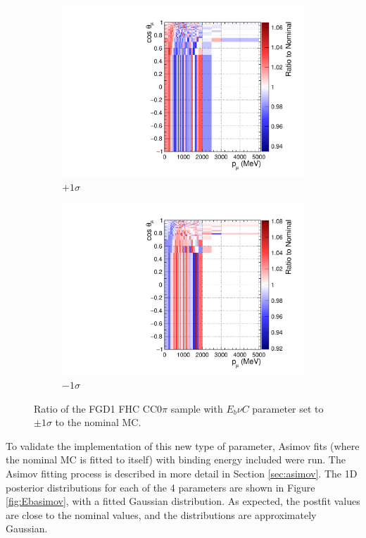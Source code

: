 \begin{figure}[t]
\centering
\begin{subfigure}{.5\textwidth}
  \centering
  \includegraphics[width=0.95\linewidth]{figs/EbNuCP1Ratio}
  \caption{$+1\sigma$}\label{fig:EbratiosP1}
\end{subfigure}%
\begin{subfigure}{.5\textwidth}
  \centering
  \includegraphics[width=0.95\linewidth]{figs/EbNuCM1Ratio}
  \caption{$-1\sigma$}\label{fig:EbratiosM1}
\end{subfigure}
\caption{Ratio of the FGD1 FHC CC0$\pi$ sample with $E_{b}\nu C$ parameter set to $\pm 1\sigma$ to the nominal MC.}
\label{fig:Ebratios}
\end{figure}

To validate the implementation of this new type of parameter, Asimov fits (where the nominal MC is fitted to itself) with binding energy included were run. The Asimov fitting process is described in more detail in Section \ref{sec:asimov}. The 1D posterior distributions for each of the 4 parameters are shown in Figure \ref{fig:Ebasimov}, with a fitted Gaussian distribution. As expected, the postfit values are close to the nominal values, and the distributions are approximately Gaussian. 

